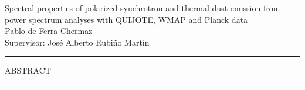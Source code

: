 \documentclass[12pt,a4paper,twocolumn]{article}
\begin{document}
\begin{strip}
\centering
{\LARGE Spectral properties of polarized synchrotron and thermal dust emission from power spectrum analyses with QUIJOTE, WMAP and Planck data} \\[0.5cm]

{\large Pablo de Ferra Chermaz} \\[0.2cm]
{\large Supervisor: José Alberto Rubiño Martín} \\[0.6cm]

\hrule
\vspace{0.25cm}

{\large ABSTRACT} \\[0.3cm]

\begin{minipage}{0.9\textwidth}
\small



\end{minipage}

\vspace{0.25cm}
\hrule
\vspace{0.8cm}
\end{strip}









\end{document}

